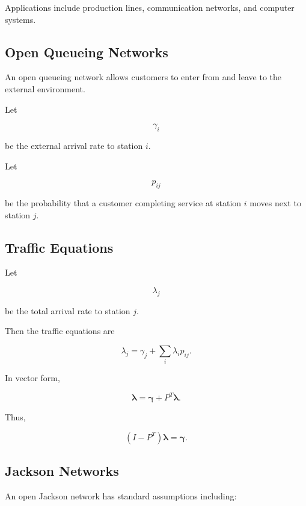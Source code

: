 Applications include production lines, communication networks, and
computer systems.

\subsection{Open Queueing Networks}
\label{subsec:open-queueing-networks}

An open queueing network allows customers to enter from and leave to the
external environment.

Let

\[
\gamma_i
\]

be the external arrival rate to station \(i\).

Let

\[
p_{ij}
\]

be the probability that a customer completing service at station \(i\)
moves next to station \(j\).

\subsection{Traffic Equations}
\label{subsec:queue-network-traffic-equations}

Let

\[
\lambda_j
\]

be the total arrival rate to station \(j\).

Then the traffic equations are

\[
\boxed{
\lambda_j
=
\gamma_j
+
\sum_i
\lambda_i p_{ij}.
}
\]

In vector form,

\[
\boxed{
\boldsymbol{\lambda}
=
\boldsymbol{\gamma}
+
P^T
\boldsymbol{\lambda}.
}
\]

Thus,

\[
\boxed{
(I-P^T)
\boldsymbol{\lambda}
=
\boldsymbol{\gamma}.
}
\]

\subsection{Jackson Networks}
\label{subsec:jackson-networks}

An open Jackson network has standard assumptions including:

